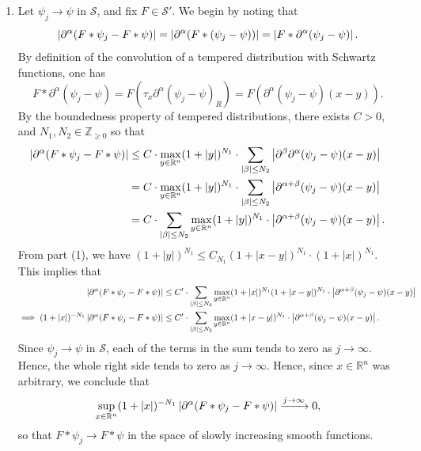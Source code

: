 \documentclass{article}
\begin{document}
\begin{itemize}
{\begin{enumerate}[itemsep =-2pt,label = (\arabic{*})]
			\item Let $\psi_{j} \to \psi$ in $\mathcal{S}$, and fix $F \in \mathcal{S}'$. We begin by noting that 
			\begin{equation}
				\left| \partial^{\alpha}(F \ast \psi_{j} - F \ast \psi) \right| = \left| \partial^{\alpha}(F \ast (\psi_{j} - \psi)) \right| = \left| F \ast \partial^{\alpha}(\psi_{j} - \psi) \right|. 
			\end{equation}
			By definition of the convolution of a tempered distribution with Schwartz functions, one has 
			\begin{equation}
				F \ast \partial^{\alpha}(\psi_{j} -\psi) = F(\tau_{x}\partial^{\alpha}(\psi_{j} - \psi)_{R}) = F(\partial^{\alpha}(\psi_{j} - \psi)(x - y)). 
			\end{equation}
			By the boundedness property of tempered distributions, there exists $C > 0$, and $N_{1}, N_{2} \in \mathbb{Z}_{\geq 0}$ so that 
			\begin{align}
				\begin{split}
					\left| \partial^{\alpha}(F \ast \psi_{j} - F \ast \psi) \right| &\leq C \cdot \max_{y \in \mathbb{R}^{n}}(1 + |y|)^{N_{1}} \cdot \sum_{|\beta|\leq N_{2}}\left| \partial^{\beta}\partial^{\alpha}(\psi_{j} - \psi)(x - y) \right| \\
					&= C \cdot \max_{y \in \mathbb{R}^{n}}(1 + |y|)^{N_{1}} \cdot \sum_{|\beta|\leq N_{2}} \left| \partial^{\alpha + \beta}(\psi_{j} - \psi)(x - y) \right| \\
					&= C \cdot \sum_{|\beta|\leq N_{2}}\max_{y \in \mathbb{R}^{n}}(1 + |y|)^{N_{1}} \cdot \left| \partial^{\alpha + \beta}(\psi_{j} - \psi)(x - y) \right|. 
				\end{split}
			\end{align}
			From part (1), we have $(1 + |y|)^{N_{1}} \leq C_{N_{1}}(1 + |x - y|)^{N_{1}} \cdot (1 + |x|)^{N_{1}}$. This implies that 
			\begin{align}
				\begin{split}
					\left| \partial^{\alpha}(F \ast \psi_{j} - F \ast \psi) \right| &\leq C' \cdot \sum_{|\beta|\leq N_{2}}\max_{y \in \mathbb{R}^{n}}(1 + |x|)^{N_{1}}(1 +|x - y|)^{N_{1}} \cdot \left| \partial^{\alpha + \beta}(\psi_{j}- \psi)(x - y) \right| \\
					\implies 
					(1 + |x|)^{-N_{1}}\left| \partial^{\alpha}(F \ast \psi_{j} - F \ast \psi) \right| &\leq C' \cdot \sum_{|\beta| \leq N_{2}}\max_{y \in \mathbb{R}^{n}}(1 + |x -y|)^{N_{1}} \cdot \left| \partial^{\alpha + \beta}(\psi_{j} - \psi)(x - y) \right|. 
				\end{split}
			\end{align}
			Since $\psi_{j} \to \psi$ in $\mathcal{S}$, each of the terms in the sum tends to zero as $j \to \infty$. Hence, the whole right side tends to zero as $j \to \infty$. Hence, since $x \in \mathbb{R}^{n}$ was arbitrary, we conclude that 
			\begin{equation}
				\sup_{x \in \mathbb{R}^{n}}(1 + |x|)^{-N_{1}}\left| \partial^{\alpha}(F \ast \psi_{j} - F \ast \psi) \right| \xrightarrow{j \to \infty} 0,
			\end{equation}
			so that $F \ast \psi_{j} \to F \ast \psi$ in the space of slowly increasing smooth functions. 
			

\end{enumerate}}
\end{itemize}
\end{document}
